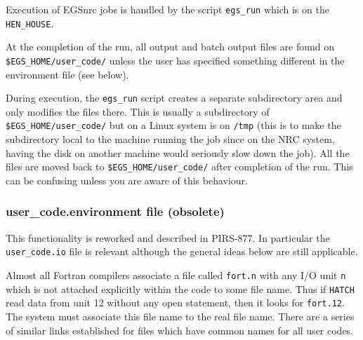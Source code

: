 Execution of EGSnrc jobs is handled by the script {\tt egs\_run}
which is on the {\tt HEN\_HOUSE}.

At the completion of the run, all output and batch output files are
found on\\
\verb+$EGS_HOME/user_code/+ unless the user has specified something
different in the environment file (see below).

During execution, the {\tt egs\_run} script creates a separate subdirectory area
and only modifies the files there. This is usually a subdirectory of
\verb+$EGS_HOME/user_code/+ but on a Linux system is on {\tt /tmp}
(this is to
make the subdirectory local to the machine running the job since on the NRC
system, having the disk on another machine would seriously slow down the
job). All
the files are moved back to \verb+$EGS_HOME/user_code/+ after
completion of the run.  This can be confusing unless you are aware of this
behaviour.

\subsubsection{user\_code.environment file (obsolete)}

This functionality is reworked and described in PIRS-877\cite{Ka03}.  In
particular the {\tt user\_code.io} file is relevant although the general
ideas below are still applicable.

%
Almost all Fortran compilers associate a file called {\tt fort.n} with any I/O
unit {\tt n} which is not attached explicitly within the code to some
file name. Thus if {\tt HATCH} read data from unit 12 without any open
statement, then it looks for {\tt fort.12}.  The system must associate
this file name to the real file name.
There are a series of similar links established
for files which have common names for all user codes.

% 
% 




